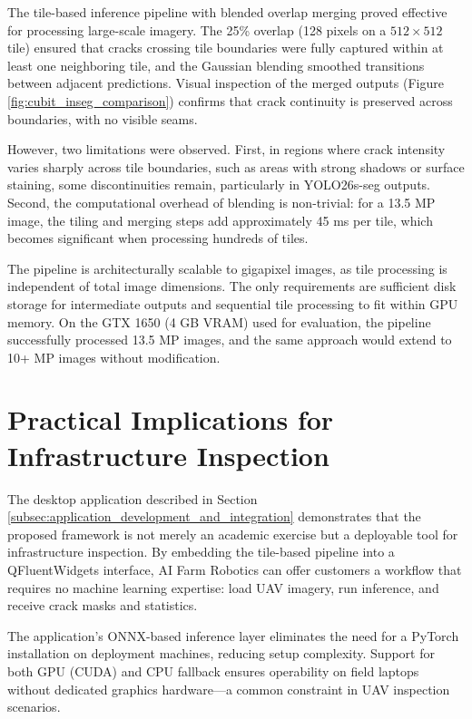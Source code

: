\hs The tile-based inference pipeline with blended overlap merging proved effective for processing large-scale imagery. The 25\% overlap (128 pixels on a $512\times512$ tile) ensured that cracks crossing tile boundaries were fully captured within at least one neighboring tile, and the Gaussian blending smoothed transitions between adjacent predictions. Visual inspection of the merged outputs (Figure \ref{fig:cubit_inseg_comparison}) confirms that crack continuity is preserved across boundaries, with no visible seams.

\hs However, two limitations were observed. First, in regions where crack intensity varies sharply across tile boundaries, such as areas with strong shadows or surface staining, some discontinuities remain, particularly in YOLO26s-seg outputs. Second, the computational overhead of blending is non-trivial: for a 13.5 MP image, the tiling and merging steps add approximately 45 ms per tile, which becomes significant when processing hundreds of tiles.

\hs The pipeline is architecturally scalable to gigapixel images, as tile processing is independent of total image dimensions. The only requirements are sufficient disk storage for intermediate outputs and sequential tile processing to fit within GPU memory. On the GTX 1650 (4 GB VRAM) used for evaluation, the pipeline successfully processed 13.5 MP images, and the same approach would extend to 10+ MP images without modification.

\section{Practical Implications for Infrastructure Inspection}
\label{sec:practical_implications_for_infrastructure_inspection}

\hs The desktop application described in Section \ref{subsec:application_development_and_integration} demonstrates that the proposed framework is not merely an academic exercise but a deployable tool for infrastructure inspection. By embedding the tile-based pipeline into a QFluentWidgets interface, AI Farm Robotics can offer customers a workflow that requires no machine learning expertise: load UAV imagery, run inference, and receive crack masks and statistics.

\hs The application's ONNX-based inference layer eliminates the need for a PyTorch installation on deployment machines, reducing setup complexity. Support for both GPU (CUDA) and CPU fallback ensures operability on field laptops without dedicated graphics hardware—a common constraint in UAV inspection scenarios.

